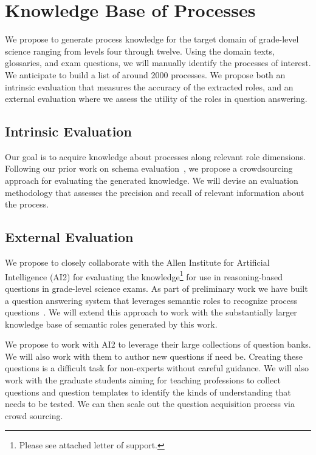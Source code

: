 \section{Knowledge Base of Processes}

We propose to generate process knowledge for the target domain of grade-level science ranging from levels four through twelve.
Using the domain texts, glossaries, and exam questions, we will manually identify the processes of interest.
We anticipate to build a list of around 2000 processes.  We propose both an intrinsic evaluation that measures the accuracy of the extracted roles, 
and an external evaluation where we assess the utility of the roles in question answering.

\subsection{Intrinsic Evaluation}

Our goal is to acquire knowledge about processes along relevant role dimensions.
Following our prior work on schema evaluation~\cite{balasubramanian2013generating}, we propose a crowdsourcing approach for evaluating the generated knowledge. We will devise an evaluation methodology that assesses the precision and recall of relevant information about the process. 

\subsection{External Evaluation}

We propose to closely collaborate with the Allen Institute for Artificial Intelligence (AI2) for evaluating the knowledge\footnote{Please see attached letter of support.} for use in reasoning-based questions in grade-level science exams. As part of preliminary work we have built a question answering system that leverages semantic roles to recognize process questions~\cite{louvan2015:kcap}. We will extend this approach to work with the substantially larger knowledge base of semantic roles generated by this work.

We propose to work with AI2 to leverage their large collections of question banks. 
We will also work with them to author new questions if need be.
Creating these questions is a difficult task for non-experts without careful guidance.
We will also work with the graduate students aiming for teaching professions to collect questions and question templates to identify the kinds of understanding that needs to be tested. We can then scale out the question acquisition process via crowd sourcing. 


